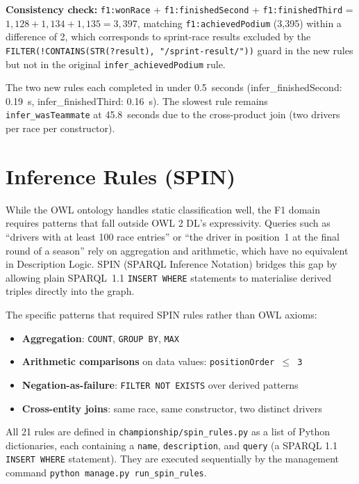 \documentclass[12pt,a4paper]{article}
\begin{document}
\textbf{Consistency check:} \texttt{f1:wonRace} + \texttt{f1:finishedSecond} + \texttt{f1:finishedThird}
= $1{,}128 + 1{,}134 + 1{,}135 = 3{,}397$, matching \texttt{f1:achievedPodium} (3{,}395)
within a difference of 2, which corresponds to sprint-race results excluded by the
\texttt{FILTER(!CONTAINS(STR(?result), "/sprint-result/"))} guard in the new rules
but not in the original \texttt{infer\_achievedPodium} rule.

The two new rules each completed in under 0.5~seconds (infer\_finishedSecond: 0.19~s,
infer\_finishedThird: 0.16~s). The slowest rule remains \texttt{infer\_wasTeammate}
at 45.8~seconds due to the cross-product join (two drivers per race per constructor).

\section{Inference Rules (SPIN)}
\label{sec:spin}

While the OWL ontology handles static classification well, the F1 domain requires
patterns that fall outside OWL 2 DL's expressivity. Queries such as ``drivers with
at least 100 race entries'' or ``the driver in position~1 at the final round of a
season'' rely on aggregation and arithmetic, which have no equivalent in Description
Logic. SPIN (SPARQL Inference Notation) bridges this gap by allowing plain
SPARQL~1.1 \texttt{INSERT WHERE} statements to materialise derived triples
directly into the graph.

The specific patterns that required SPIN rules rather than OWL axioms:
\begin{itemize}[leftmargin=1.5em]
  \item \textbf{Aggregation}: \texttt{COUNT}, \texttt{GROUP BY}, \texttt{MAX}
  \item \textbf{Arithmetic comparisons} on data values: \texttt{positionOrder $\leq$ 3}
  \item \textbf{Negation-as-failure}: \texttt{FILTER NOT EXISTS} over derived patterns
  \item \textbf{Cross-entity joins}: same race, same constructor, two distinct drivers
\end{itemize}

All 21 rules are defined in \texttt{championship/spin\_rules.py} as a list of
Python dictionaries, each containing a \texttt{name}, \texttt{description}, and
\texttt{query} (a SPARQL 1.1 \texttt{INSERT WHERE} statement). They are executed
sequentially by the management command \texttt{python manage.py run\_spin\_rules}.
\end{document}
